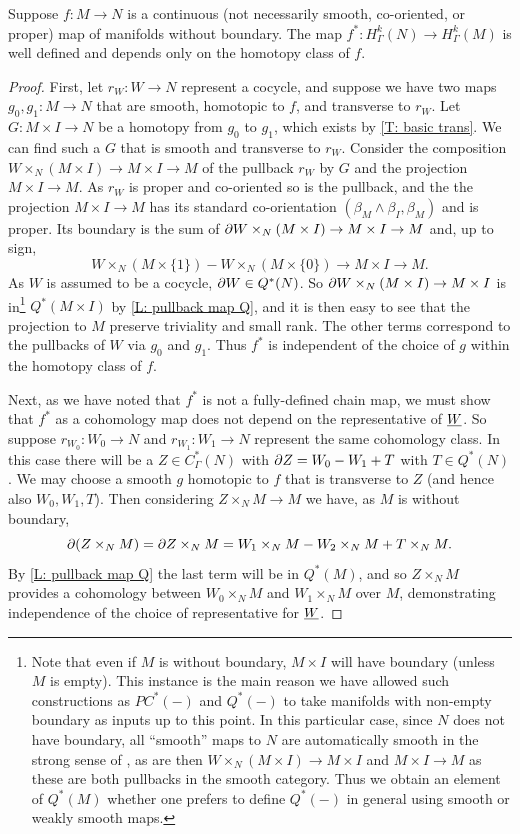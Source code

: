 \begin{proposition}\label{P: cohomology pullback}
	Suppose $f \colon M \to N$ is a continuous (not necessarily smooth, co-oriented, or proper) map of manifolds without boundary.
	The map $f^* \colon H^k_\Gamma(N) \to H^k_\Gamma(M)$ is well defined and depends only on the homotopy class of $f$.
\end{proposition}

\begin{proof}
	First, let $r_W \colon W \to N$ represent a cocycle, and suppose we have two maps $g_0, g_1 \colon M \to N$ that are smooth, homotopic to $f$, and transverse to $r_W$.
	Let $G \colon M \times I \to N$ be a homotopy from $g_0$ to $g_1$, which exists by \cref{T: basic trans}.
	We can find such a $G$ that is smooth and transverse to $r_W$.
	Consider the composition $W \times_N (M \times I) \to M \times I \to M$ of the pullback $r_W$ by $G$ and the projection $M \times I \to M$.
	As $r_W$ is proper and co-oriented so is the pullback, and the the projection $M \times I \to M$ has its standard co-orientation $(\beta_M \wedge \beta_I,\beta_M)$ and is proper.
	Its boundary is the sum of $\partial W \times_N (M \times I) \to M \times I \to M$ and, up to sign, $$W \times_N (M \times \{1\}) - W \times_N (M \times \{0\}) \to M \times I \to M.$$ As $W$ is assumed to be a cocycle, $\partial W \in Q^*(N)$.
	So $\partial W \times_N (M \times I) \to M \times I$ is in\footnote{Note that even if $M$ is without boundary, $M \times I$ will have boundary (unless $M$ is empty).
		This instance is the main reason we have allowed such constructions as $PC^*(-)$ and $Q^*(-)$ to take manifolds with non-empty boundary as inputs up to this point.
		In this particular case, since $N$ does not have boundary, all ``smooth'' maps to $N$ are automatically smooth in the strong sense of \cite{Joy12}, as are then $W \times_N (M \times I) \to M \times I$ and $M \times I \to M$ as these are both pullbacks in the smooth category.
		Thus we obtain an element of $Q^*(M)$ whether one prefers to define $Q^*(-)$ in general using smooth or weakly smooth maps.} $Q^*(M \times I)$ by \cref{L: pullback map Q}, and it is then easy to see that the projection to $M$ preserve triviality and small rank.
	The other terms correspond to the pullbacks of $W$ via $g_0$ and $g_1$.
	Thus $f^*$ is independent of the choice of $g$ within the homotopy class of $f$.

	Next, as we have noted that $f^*$ is not a fully-defined chain map, we must show that $f^*$ as a cohomology map does not depend on the representative of $\underline{W}$.
	So suppose $r_{W_0} \colon W_0 \to N$ and $r_{W_1} \colon W_1 \to N$ represent the same cohomology class.
	In this case there will be a $Z \in C^*_\Gamma(N)$ with $\partial Z = W_0-W_1+T$ with $T \in Q^*(N)$.
	We may choose a smooth $g$ homotopic to $f$ that is transverse to $Z$ (and hence also $W_0,W_1, T$).
	Then considering $Z \times_N M \to M$ we have, as $M$ is without boundary,
	$$\partial(Z \times_N M) = \partial Z \times_N M = W_1 \times_N M -W_2 \times_N M+T \times_N M.$$
	By \cref{L: pullback map Q} the last term will be in $Q^*(M)$, and so $Z \times_N M$ provides a cohomology between $W_0 \times_N M$ and $W_1 \times_N M$ over $M$, demonstrating independence of the choice of representative for $\underline{W}$.


\end{proof}
